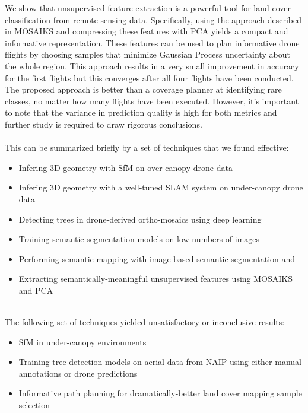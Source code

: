 We show that unsupervised feature extraction is a powerful tool for land-cover classification from remote sensing data. Specifically, using the approach described in MOSAIKS and compressing these features with PCA yields a compact and informative representation. These features can be used to plan informative drone flights by choosing samples that minimize Gaussian Process uncertainty about the whole region. This approach results in a very small improvement in accuracy for the first flights but this converges after all four flights have been conducted. The proposed approach is better than a coverage planner at identifying rare classes, no matter how many flights have been executed. However, it's important to note that the variance in prediction quality is high for both metrics and further study is required to draw rigorous conclusions.
\\
\\
This can be summarized briefly by a set of techniques that we found effective:
\begin{itemize}
    \item Infering 3D geometry with SfM on over-canopy drone data
    \item Infering 3D geometry with a well-tuned SLAM system on under-canopy drone data
    \item Detecting trees in drone-derived ortho-mosaics using deep learning
    \item Training semantic segmentation models on low numbers of images
    \item Performing semantic mapping with image-based semantic segmentation and 
    \item Extracting semantically-meaningful unsupervised features using MOSAIKS \cite{Rolf2021} and PCA
\\
\\
\end{itemize}
The following set of techniques yielded unsatisfactory or inconclusive results:
\begin{itemize}
    \item SfM in under-canopy environments
    \item Training tree detection models on aerial data from NAIP using either manual annotations or drone predictions
    \item Informative path planning for dramatically-better land cover mapping sample selection
\end{itemize}


